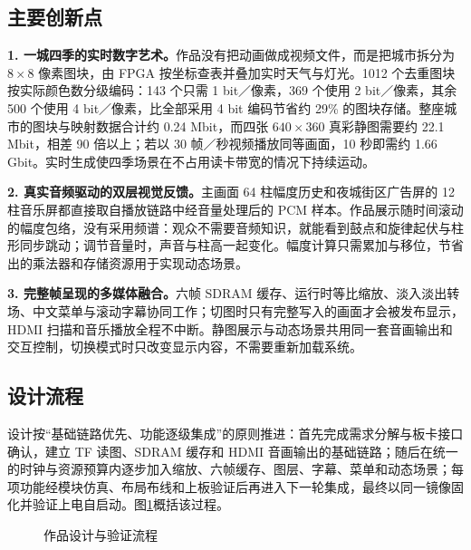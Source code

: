 \subsection{主要创新点}
\textbf{1. 一城四季的实时数字艺术。}作品没有把动画做成视频文件，而是把城市拆分为 $8\times8$ 像素图块，由 FPGA 按坐标查表并叠加实时天气与灯光。1012 个去重图块按实际颜色数分级编码：143 个只需 1 bit／像素，369 个使用 2 bit／像素，其余 500 个使用 4 bit／像素，比全部采用 4 bit 编码节省约 29\% 的图块存储。整座城市的图块与映射数据合计约 0.24 Mbit，而四张 $640\times360$ 真彩静图需要约 22.1 Mbit，相差 90 倍以上；若以 30 帧／秒视频播放同等画面，10 秒即需约 1.66 Gbit。实时生成使四季场景在不占用读卡带宽的情况下持续运动。

\textbf{2. 真实音频驱动的双层视觉反馈。}主画面 64 柱幅度历史和夜城街区广告屏的 12 柱音乐屏都直接取自播放链路中经音量处理后的 PCM 样本。作品展示随时间滚动的幅度包络，没有采用频谱：观众不需要音频知识，就能看到鼓点和旋律起伏与柱形同步跳动；调节音量时，声音与柱高一起变化。幅度计算只需累加与移位，节省出的乘法器和存储资源用于实现动态场景。

\textbf{3. 完整帧呈现的多媒体融合。}六帧 SDRAM 缓存、运行时等比缩放、淡入淡出转场、中文菜单与滚动字幕协同工作；切图时只有完整写入的画面才会被发布显示，HDMI 扫描和音乐播放全程不中断。静图展示与动态场景共用同一套音画输出和交互控制，切换模式时只改变显示内容，不需要重新加载系统。

\subsection{设计流程}
设计按“基础链路优先、功能逐级集成”的原则推进：首先完成需求分解与板卡接口确认，建立 TF 读图、SDRAM 缓存和 HDMI 音画输出的基础链路；随后在统一的时钟与资源预算内逐步加入缩放、六帧缓存、图层、字幕、菜单和动态场景；每项功能经模块仿真、布局布线和上板验证后再进入下一轮集成，最终以同一镜像固化并验证上电自启动。图\ref{fig:workflow}概括该过程。

\begin{figure}[H]\centering
{}
\caption{作品设计与验证流程}\label{fig:workflow}
\end{figure}
